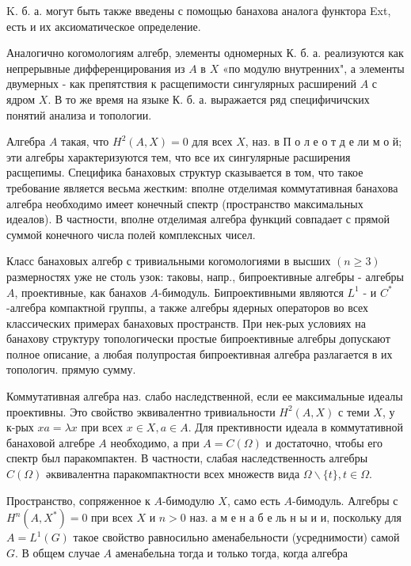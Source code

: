 \documentclass[10pt]{article}
\begin{document}
K. б. а. могут быть также введены с помощью банахова аналога функтора Ext, есть и их аксиоматическое определение.



Аналогично когомологиям алгебр, элементы одномерных К. б. а. реализуются как непрерывные дифференцирования из $A$ в $X$ «по модулю внутренних", а элементы двумерных - как препятствия к расщепимости сингулярных расширений $A$ с ядром $X$. В то же время на языке К. б. а. выражается ряд специфичичских понятий анализа и топологии.



Алгебра $A$ такая, что $H^{2}(A, X)=0$ для всех $X$, наз. в П о л е о т д е ли м о й; эти алгебры характеризуются тем, что все их сингулярные расширения расщепимы. Специфика банаховых структур сказывается в том, что такое требование является весьма жестким: вполне отделимая коммутативная банахова алгебра необходимо имеет конечный спектр (пространство максимальных идеалов). В частности, вполне отделимая алгебра функций совпадает с прямой суммой конечного числа полей комплексных чисел.



Класс банаховых алгебр с тривиальными когомологиями в высших $(n \geqslant 3)$ размерностях уже не столь узок: таковы, напр., бипроективные алгебры - алгебры $A$, проективные, как банахов $A$-бимодуль. Бипроективными являются $L^{1}$ - и $C^{*}$-алгебра компактной группы, а также алгебры ядерных операторов во всех классических примерах банаховых пространств. При нек-рых условиях на банахову структуру топологически простые бипроективные алгебры допускают полное описание, а любая полупростая бипроективная алгебра разлагается в их топологич. прямую сумму.



Коммутативная алгебра наз. слабо наследственной, если ее максимальные идеалы проективны. Это свойство эквивалентно тривиальности $H^{2}(A, X)$ с теми $X$, у к-рых $x a=\lambda x$ при всех $x \in X, a \in A$. Для прективности идеала в коммутативной банаховой алгебре $A$ необходимо, а при $A=C(\Omega)$ и достаточно, чтобы его спектр был паракомпактен. В частности, слабая наследственность алгебры $C(\Omega)$ әквивалентна паракомпактности всех множеств вида $\Omega \backslash\{t\}, t \in \Omega$.



Пространство, сопряженное к $A$-бимодулю $X$, само есть $A$-бимодуль. Алгебры с $H^{n}\left(A, X^{*}\right)=0$ при всех $X$ и $n>0$ наз. а м е н а б е ль н ы и и, поскольку для $A=L^{1}(G)$ такое свойство равносильно аменабельности (усреднимости) самой $G$. В общем случае $A$ аменабельна тогда и только тогда, когда алгебра
\end{document}
